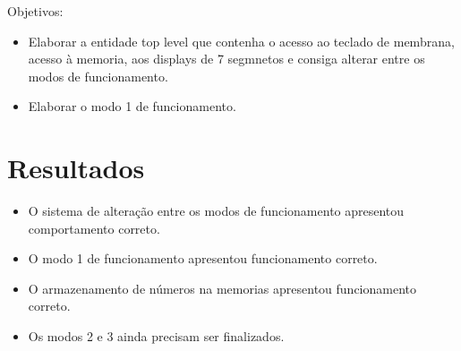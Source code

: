 \documentclass[12pt, a4paper]{article}
\begin{document}
	 Objetivos:
	 
	 \begin{itemize}
	 	\item Elaborar a entidade top level que contenha o acesso ao teclado de membrana, acesso à memoria, 
	 	aos displays de 7 segmnetos e consiga alterar entre os modos de funcionamento.
	 	
	 	\item Elaborar o modo 1 de funcionamento.
	 \end{itemize}
	
	\section*{Resultados}
	
	\begin{itemize}
		\item O sistema de alteração entre os modos de funcionamento apresentou comportamento correto.
		
		\item O modo 1 de funcionamento apresentou funcionamento correto.
		
		\item O armazenamento de números na memorias apresentou funcionamento correto.
		
		\item Os modos 2 e 3 ainda precisam ser finalizados.
	\end{itemize}
	
	
	
\end{document}

